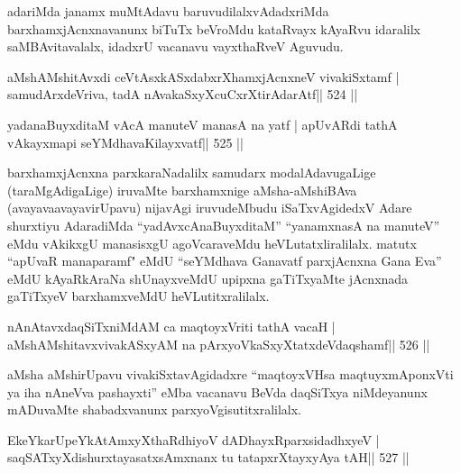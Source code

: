 \begin{artha}
adariMda janamx muMtAdavu baruvudilalxvAdadxriMda barxhamxjAcnxnavanunx biTuTx beVroMdu kataRvayx kAyaRvu idaralilx saMBAvitavalalx, idadxrU vacanavu vayxthaRveV Aguvudu.
\end{artha}




\begin{shl}
aMshAMshitAvxdi ceVtAsxkASxdabxrXhamxjAcnxneV vivakiSxtamf |
samudArxdeVriva, tadA nAvakaSxyXcuCxrXtirAdarAtf\hfill || 524 ||
\end{shl}

\begin{shl}
yadanaBuyxditaM vAcA manuteV manasA na yatf |
apUvARdi tathA vAkayxmapi seYMdhavaKilayxvatf\hfill || 525 ||
\end{shl}

\begin{artha}
barxhamxjAcnxna parxkaraNadalilx samudarx modalAdavugaLige
(taraMgAdigaLige) iruvaMte barxhamxnige aMsha-aMshiBAva 
(avayavaavayavirUpavu) nijavAgi iruvudeMbudu iSaTxvAgidedxV Adare shurxtiyu
AdaradiMda ``yadAvxcAnaBuyxditaM'' ``yanamxnasA na manuteV'' eMdu
vAkikxgU manasisxgU agoVcaraveMdu heVLutatxliralilalx. matutx ``apUvaR
manaparamf" eMdU ``seYMdhava Ganavatf parxjAcnxna Gana Eva'' eMdU
kAyaRkAraNa shUnayxveMdU upipxna gaTiTxyaMte jAcnxnada gaTiTxyeV
barxhamxveMdU heVLutitxralilalx.
\end{artha}


\begin{shl}
nAnAtavxdaqSiTxniMdAM ca maqtoyxVriti tathA vacaH |
aMshAMshitavxvivakASxyAM na pArxyoVkaSxyXtatxdeVdaqshamf\hfill || 526 ||
\end{shl}

\begin{artha}
aMsha aMshirUpavu vivakiSxtavAgidadxre ``maqtoyxVHsa maqtuyxmAponxVti ya iha nAneVva pashayxti'' eMba vacanavu BeVda daqSiTxya niMdeyanunx mADuvaMte shabadxvanunx parxyoVgisutitxralilalx.
\end{artha}



\begin{shl}
EkeYkarUpeYkAtAmxyXthaRdhiyoV dADhayxRparxsidadhxyeV |
saqSATxyXdishurxtayasatxsAmxnanx tu tatapxrXtayxyAya tAH\hfill || 527 ||
\end{shl}

